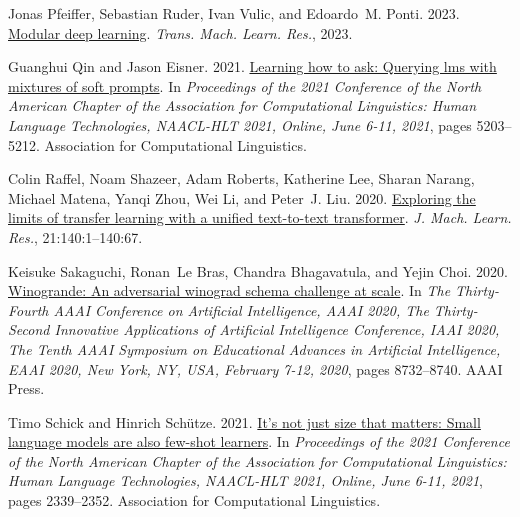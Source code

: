 \documentclass[11pt,dvipsnames]{article}
\begin{document}
{\begin{thebibliography}{73}
Jonas Pfeiffer, Sebastian Ruder, Ivan Vulic, and Edoardo~M. Ponti. 2023.
\newblock \href {https://openreview.net/forum?id=z9EkXfvxta} {Modular deep
  learning}.
\newblock \emph{Trans. Mach. Learn. Res.}, 2023.

Guanghui Qin and Jason Eisner. 2021.
\newblock \href {https://doi.org/10.18653/v1/2021.naacl-main.410} {Learning how
  to ask: Querying lms with mixtures of soft prompts}.
\newblock In \emph{Proceedings of the 2021 Conference of the North American
  Chapter of the Association for Computational Linguistics: Human Language
  Technologies, {NAACL-HLT} 2021, Online, June 6-11, 2021}, pages 5203--5212.
  Association for Computational Linguistics.

Colin Raffel, Noam Shazeer, Adam Roberts, Katherine Lee, Sharan Narang, Michael
  Matena, Yanqi Zhou, Wei Li, and Peter~J. Liu. 2020.
\newblock \href {http://jmlr.org/papers/v21/20-074.html} {Exploring the limits
  of transfer learning with a unified text-to-text transformer}.
\newblock \emph{J. Mach. Learn. Res.}, 21:140:1--140:67.

Keisuke Sakaguchi, Ronan~Le Bras, Chandra Bhagavatula, and Yejin Choi. 2020.
\newblock \href {https://doi.org/10.1609/AAAI.V34I05.6399} {Winogrande: An
  adversarial winograd schema challenge at scale}.
\newblock In \emph{The Thirty-Fourth {AAAI} Conference on Artificial
  Intelligence, {AAAI} 2020, The Thirty-Second Innovative Applications of
  Artificial Intelligence Conference, {IAAI} 2020, The Tenth {AAAI} Symposium
  on Educational Advances in Artificial Intelligence, {EAAI} 2020, New York,
  NY, USA, February 7-12, 2020}, pages 8732--8740. {AAAI} Press.

Timo Schick and Hinrich Sch{\"{u}}tze. 2021.
\newblock \href {https://doi.org/10.18653/v1/2021.naacl-main.185} {It's not
  just size that matters: Small language models are also few-shot learners}.
\newblock In \emph{Proceedings of the 2021 Conference of the North American
  Chapter of the Association for Computational Linguistics: Human Language
  Technologies, {NAACL-HLT} 2021, Online, June 6-11, 2021}, pages 2339--2352.
  Association for Computational Linguistics.


\end{thebibliography}}
\end{document}

